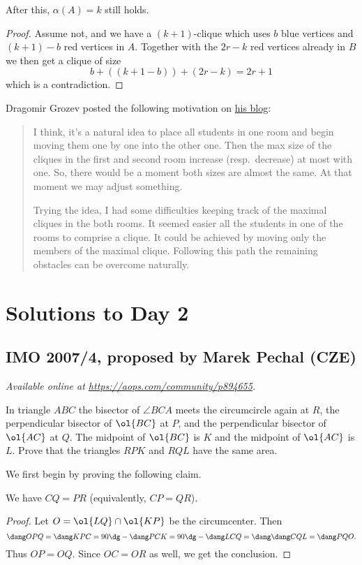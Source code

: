 \documentclass[11pt]{scrartcl}
\begin{document}
\begin{claim*}
  After this, $\alpha(A) = k$ still holds.
\end{claim*}
\begin{proof}
  Assume not, and we have a $(k+1)$-clique
  which uses $b$ blue vertices and $(k+1)-b$ red vertices in $A$.
  Together with the $2r-k$ red vertices already in $B$
  we then get a clique of size
  \[ b + \left( (k+1-b) \right)
  + \left( 2r-k \right) = 2r + 1 \]
  which is a contradiction.
\end{proof}

\begin{remark*}
  Dragomir Grozev posted the
  following motivation on
  \href{https://dgrozev.wordpress.com/2019/12/05/splitting-the-cliques-of-a-graph-imo-2007-p3/}{his blog}:
  \begin{quote}
  I think, it’s a natural idea to
  place all students in one room and begin
  moving them one by one into the other one.
  Then the max size of the cliques in the first and second room
  increase (resp.\ decrease) at most with one.
  So, there would be a moment both sizes are almost the same.
  At that moment we may adjust something.

  Trying the idea, I had some difficulties
  keeping track of the maximal cliques in the both rooms.
  It seemed easier all the students in one of the rooms
  to comprise a clique.
  It could be achieved by moving only the members
  of the maximal clique.
  Following this path the remaining obstacles
  can be overcome naturally.
  \end{quote}
\end{remark*}
\pagebreak

\section{Solutions to Day 2}
\subsection{IMO 2007/4, proposed by Marek Pechal (CZE)}
\textsl{Available online at \url{https://aops.com/community/p894655}.}
\begin{mdframed}[style=mdpurplebox,frametitle={Problem statement}]
In triangle $ABC$ the bisector of $\angle BCA$
meets the circumcircle again at $R$,
the perpendicular bisector of $\ol{BC}$ at $P$,
and the perpendicular bisector of $\ol{AC}$ at $Q$.
The midpoint of $\ol{BC}$ is $K$ and the midpoint of $\ol{AC}$ is $L$.
Prove that the triangles $RPK$ and $RQL$ have the same area.
\end{mdframed}
We first begin by proving the following claim.
\begin{claim*}
  We have $CQ = PR$ (equivalently, $CP = QR$).
\end{claim*}
\begin{proof}
  Let $O = \ol{LQ} \cap \ol{KP}$ be the circumcenter.
  Then
  \[ \dang OPQ = \dang KPC = 90\dg - \dang PCK
  = 90\dg - \dang LCQ = \dang \dang CQL = \dang PQO. \]
  Thus $OP = OQ$.
  Since $OC = OR$ as well, we get the conclusion.
\end{proof}
\end{document}
